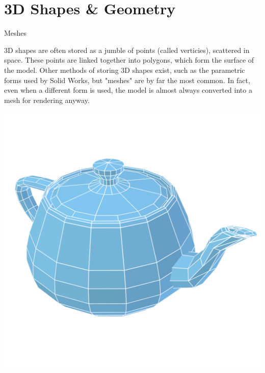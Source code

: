 \documentclass{lug}
\newcommand{\splitslide}[4]{
    \noindent
    \begin{minipage}{#1 \textwidth - #2 }
        #3
    \end{minipage}%
    \hspace{ \dimexpr #2 * 2 \relax }%
    \begin{minipage}{\textwidth - #1 \textwidth - #2 }
        #4
    \end{minipage}
}
\begin{document}
\section{3D Shapes \& Geometry}

\begin{frame}{Meshes}
    \splitslide{0.65}{.7em}{
        \small

        3D shapes are often stored as a jumble of points (called verticies),
        scattered in space. These points are linked together into polygons,
        which form the surface of the model. Other methods of storing 3D
        shapes exist, such as the parametric forms used by Solid Works, but
        "meshes" are by far the most common. In fact, even when a different
        form is used, the model is almost always converted into a mesh for
        rendering anyway.

    }{
        \includegraphics[width=\textwidth]{graphics/teapot_mesh}
    }
\end{frame}
\end{document}
